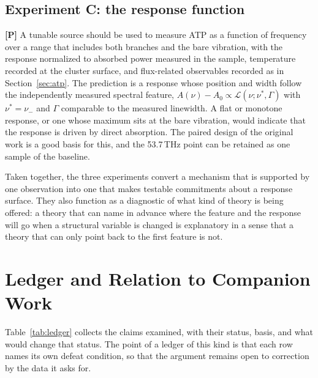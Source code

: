 \documentclass[11pt]{article}
\newcommand{\stP}{\textbf{\textcolor{violet!80!black}{[P]}}}
\theoremstyle{plain}
\theoremstyle{definition}
\theoremstyle{remark}
\begin{document}
\subsection{Experiment C: the response function}

\stP{} A tunable source should be used to measure ATP as a function of frequency over a range that includes both branches and the bare vibration, with the response normalized to absorbed power measured in the sample, temperature recorded at the cluster surface, and flux-related observables recorded as in Section~\ref{sec:atp}. The prediction is a response whose position and width follow the independently measured spectral feature, $A(\nu)-A_0\propto\mathcal L(\nu;\nu^*,\Gamma)$ with $\nu^*=\nu_-$ and $\Gamma$ comparable to the measured linewidth. A flat or monotone response, or one whose maximum sits at the bare vibration, would indicate that the response is driven by direct absorption. The paired design of the original work is a good basis for this, and the 53.7\,THz point can be retained as one sample of the baseline.

Taken together, the three experiments convert a mechanism that is supported by one observation into one that makes testable commitments about a response surface. They also function as a diagnostic of what kind of theory is being offered: a theory that can name in advance where the feature and the response will go when a structural variable is changed is explanatory in a sense that a theory that can only point back to the first feature is not.

\section{Ledger and Relation to Companion Work}
\label{sec:ledger}

Table~\ref{tab:ledger} collects the claims examined, with their status, basis, and what would change that status. The point of a ledger of this kind is that each row names its own defeat condition, so that the argument remains open to correction by the data it asks for.
\end{document}
